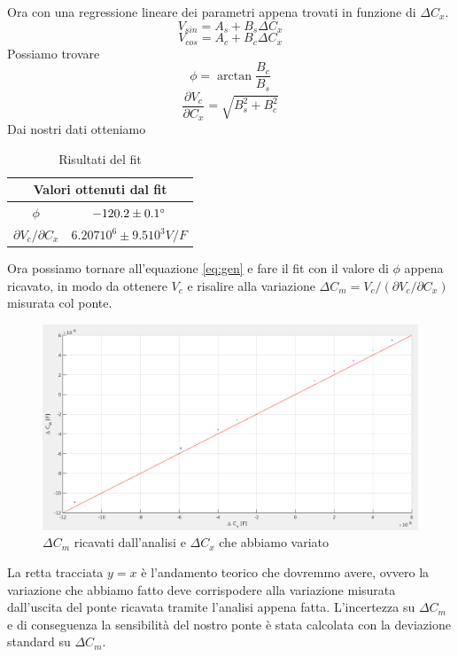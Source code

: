 \documentclass[12pt,]{article}
\begin{document}
Ora con una regressione lineare dei parametri appena trovati in funzione di $ \Delta C_x$.
$$V_{sin}= A_s + B_s \Delta{C_x}$$
$$V_{cos} = A_c + B_c \Delta{C_x}$$
Possiamo trovare 
\begin{equation}
\phi = \arctan{\frac{B_c}{B_s}}
\end{equation}
\begin{equation}
\frac{\partial{V_{c}}}{\partial{C_x}} = \sqrt{B_s^2 + B_c^2}
\end{equation}
Dai nostri dati otteniamo
\begin{table}[H]
\centering
\begin{tabular}{c|c}
\toprule
\multicolumn{2}{c}{Valori ottenuti dal fit}\\
\midrule
\rowcolor{black!20}$\phi$ & $-120.2 \pm 0.1 \degree$ \\
$\partial V_{c}/\partial C_x $ & $ 6.207 10^{6}\pm 9.5 10^{3} V/F $ \\
\bottomrule
\end{tabular}
\caption{Risultati del fit}
\end{table}
Ora possiamo tornare all'equazione \eqref{eq:gen} e fare il fit con il valore di $\phi$ appena ricavato, in modo da ottenere $V_c$ e risalire alla variazione $\Delta C_m = V_c/(\partial V_{c}/\partial{C_x})$ misurata col ponte.
\begin{figure}[H]
\centering
\includegraphics[width=\textwidth]{deltacm}
\caption{$\Delta C_m$ ricavati dall'analisi e $\Delta C_x$ che abbiamo variato}
\end{figure}
La retta tracciata $y=x$ è l'andamento teorico che dovremmo avere, ovvero la variazione che abbiamo fatto deve corrispodere alla variazione misurata dall'uscita del ponte ricavata tramite l'analisi appena fatta. L'incertezza su $\Delta C_m$ e di conseguenza la sensibilità del nostro ponte è stata calcolata con la deviazione standard su $\Delta C_m$.
\end{document}
